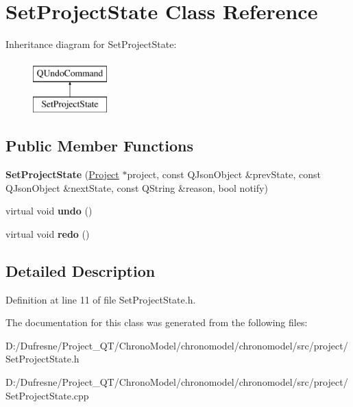 \hypertarget{class_set_project_state}{\section{Set\-Project\-State Class Reference}
\label{class_set_project_state}
}
Inheritance diagram for Set\-Project\-State\-:\begin{figure}[H]
\begin{center}
\leavevmode
\includegraphics[height=2.000000cm]{class_set_project_state}
\end{center}
\end{figure}
\subsection*{Public Member Functions}
\begin{DoxyCompactItemize}
\item 
\hypertarget{class_set_project_state_a64b1f260df5f3228509488814858bbe3}{{\bfseries Set\-Project\-State} (\hyperlink{class_project}{Project} $\ast$project, const Q\-Json\-Object \&prev\-State, const Q\-Json\-Object \&next\-State, const Q\-String \&reason, bool notify)}\label{class_set_project_state_a64b1f260df5f3228509488814858bbe3}

\item 
\hypertarget{class_set_project_state_a3639acded5a874ffda3b467db27873b4}{virtual void {\bfseries undo} ()}\label{class_set_project_state_a3639acded5a874ffda3b467db27873b4}

\item 
\hypertarget{class_set_project_state_afb38ad48d5e7e5d42f0c0346882c77db}{virtual void {\bfseries redo} ()}\label{class_set_project_state_afb38ad48d5e7e5d42f0c0346882c77db}

\end{DoxyCompactItemize}


\subsection{Detailed Description}


Definition at line 11 of file Set\-Project\-State.\-h.



The documentation for this class was generated from the following files\-:\begin{DoxyCompactItemize}
\item 
D\-:/\-Dufresne/\-Project\-\_\-\-Q\-T/\-Chrono\-Model/chronomodel/chronomodel/src/project/Set\-Project\-State.\-h\item 
D\-:/\-Dufresne/\-Project\-\_\-\-Q\-T/\-Chrono\-Model/chronomodel/chronomodel/src/project/Set\-Project\-State.\-cpp\end{DoxyCompactItemize}
